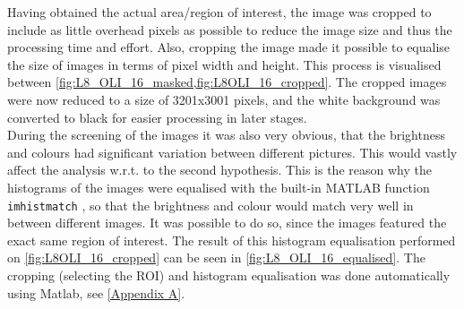 Having obtained the actual area/region of interest, the image was cropped to include as little overhead pixels as possible to reduce the image size and thus the processing time and effort. Also, cropping the image made it possible to equalise the size of images in terms of pixel width and height. This process is visualised between \cref{fig:L8_OLI_16_masked,fig:L8OLI_16_cropped}. The cropped images were now reduced to a size of 3201x3001 pixels, and the white background was converted to black for easier processing in later stages. \\
During the screening of the images it was also very obvious, that the brightness and colours had significant variation between different pictures. This would vastly affect the analysis w.r.t. to the second hypothesis. This is the reason why the histograms of the images were equalised with the built-in MATLAB function \texttt{imhistmatch} , so that the brightness and colour would match very well in between different images. It was possible to do so, since the images featured the exact same region of interest. The result of this histogram equalisation performed on \cref{fig:L8OLI_16_cropped} can be seen in \cref{fig:L8_OLI_16_equalised}.
The cropping (selecting the ROI) and histogram equalisation was done automatically using Matlab, see \cref{Appendix A}.


